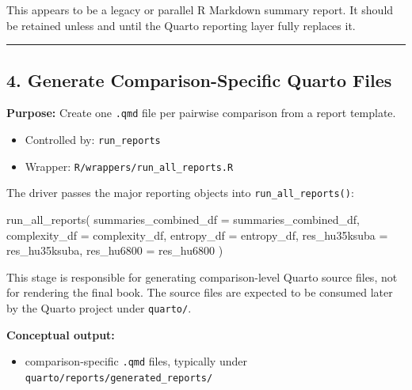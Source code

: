 \documentclass[
  letterpaper,
  DIV=11,
  numbers=noendperiod,
  openany,
  oneside]{scrreprt}
\newenvironment{Shaded}{\begin{snugshade}}{\end{snugshade}}
\newcommand{\AttributeTok}[1]{\textcolor[rgb]{0.40,0.45,0.13}{#1}}
\newcommand{\FunctionTok}[1]{\textcolor[rgb]{0.28,0.35,0.67}{#1}}
\newcommand{\NormalTok}[1]{\textcolor[rgb]{0.00,0.23,0.31}{#1}}
\providecommand{\tightlist}{%
  \setlength{\itemsep}{0pt}\setlength{\parskip}{0pt}}
\begin{document}
This appears to be a legacy or parallel R Markdown summary report. It
should be retained unless and until the Quarto reporting layer fully
replaces it.

\begin{center}\rule{0.5\linewidth}{0.5pt}\end{center}

\subsection*{4. Generate Comparison-Specific Quarto
Files}\label{generate-comparison-specific-quarto-files}

\textbf{Purpose:} Create one \texttt{.qmd} file per pairwise comparison
from a report template.

\begin{itemize}
\tightlist
\item
  Controlled by: \texttt{run\_reports}
\item
  Wrapper: \texttt{R/wrappers/run\_all\_reports.R}
\end{itemize}

The driver passes the major reporting objects into
\texttt{run\_all\_reports()}:

\begin{Shaded}
\begin{Highlighting}[]
\FunctionTok{run\_all\_reports}\NormalTok{(}
  \AttributeTok{summaries\_combined\_df =}\NormalTok{ summaries\_combined\_df,}
  \AttributeTok{complexity\_df =}\NormalTok{ complexity\_df,}
  \AttributeTok{entropy\_df =}\NormalTok{ entropy\_df,}
  \AttributeTok{res\_hu35ksuba =}\NormalTok{ res\_hu35ksuba,}
  \AttributeTok{res\_hu6800 =}\NormalTok{ res\_hu6800}
\NormalTok{)}
\end{Highlighting}
\end{Shaded}

This stage is responsible for generating comparison-level Quarto source
files, not for rendering the final book. The source files are expected
to be consumed later by the Quarto project under \texttt{quarto/}.

\textbf{Conceptual output:}

\begin{itemize}
\tightlist
\item
  comparison-specific \texttt{.qmd} files, typically under
  \texttt{quarto/reports/generated\_reports/}
\end{itemize}
\end{document}
